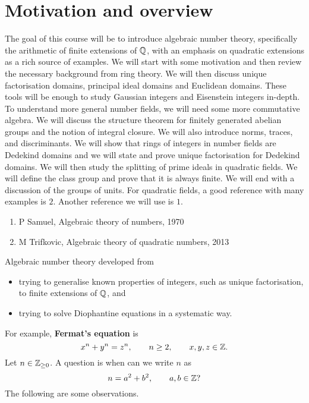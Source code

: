 





\section{Motivation and overview}


The goal of this course will be to introduce algebraic number theory, specifically the arithmetic of finite extensions of $ \mathbb{Q} $, with an emphasis on quadratic extensions as a rich source of examples. We will start with some motivation and then review the necessary background from ring theory. We will then discuss unique factorisation domains, principal ideal domains and Euclidean domains. These tools will be enough to study Gaussian integers and Eisenstein integers in-depth. To understand more general number fields, we will need some more commutative algebra. We will discuss the structure theorem for finitely generated abelian groups and the notion of integral closure. We will also introduce norms, traces, and discriminants. We will show that rings of integers in number fields are Dedekind domains and we will state and prove unique factorisation for Dedekind domains. We will then study the splitting of prime ideals in quadratic fields. We will define the class group and prove that it is always finite. We will end with a discussion of the groups of units. For quadratic fields, a good reference with many examples is $ 2 $. Another reference we will use is $ 1 $.
\begin{enumerate}
\item P Samuel, Algebraic theory of numbers, 1970
\item M Trifkovic, Algebraic theory of quadratic numbers, 2013
\end{enumerate}
Algebraic number theory developed from
\begin{itemize}
\item trying to generalise known properties of integers, such as unique factorisation, to finite extensions of $ \mathbb{Q} $, and
\item trying to solve Diophantine equations in a systematic way.
\end{itemize}
For example, \textbf{Fermat's equation} is
$$ x^n + y^n = z^n, \qquad n \ge 2, \qquad x, y, z \in \mathbb{Z}. $$
Let $ n \in \mathbb{Z}_{\ge 0} $. A question is when can we write $ n $ as
$$ n = a^2 + b^2, \qquad a, b \in \mathbb{Z}? $$
The following are some observations.
